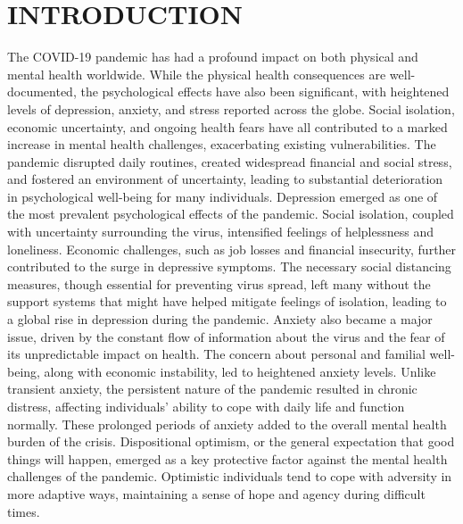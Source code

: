 \documentclass[a4paper]{article}
\begin{document}
\section{INTRODUCTION}
\vspace{0.5em}
The COVID-19 pandemic has had a profound impact on both physical and mental health worldwide.
While the physical health consequences are well-documented, the psychological effects have also been significant, with heightened levels of depression, anxiety, and stress reported across the globe.
Social isolation, economic uncertainty, and ongoing health fears have all contributed to a marked increase in mental health challenges, exacerbating existing vulnerabilities.
The pandemic disrupted daily routines, created widespread financial and social stress, and fostered an environment of uncertainty, leading to substantial deterioration in psychological well-being for many individuals.
\vspace{0.5em}\newline
Depression emerged as one of the most prevalent psychological effects of the pandemic.
Social isolation, coupled with uncertainty surrounding the virus, intensified feelings of helplessness and loneliness. Economic challenges, such as job losses and financial insecurity, further contributed to the surge in depressive symptoms.
The necessary social distancing measures, though essential for preventing virus spread,
left many without the support systems that might have helped mitigate feelings of isolation, leading to a global rise in depression during the pandemic.
\vspace{0.5em}\newline
Anxiety also became a major issue, driven by the constant flow of information about the virus and the fear of its unpredictable impact on health.
The concern about personal and familial well-being, along with economic instability, led to heightened anxiety levels.
Unlike transient anxiety, the persistent nature of the pandemic resulted in chronic distress, affecting individuals' ability to cope with daily life and function normally.
These prolonged periods of anxiety added to the overall mental health burden of the crisis.
\vspace{0.5em}\newline
Dispositional optimism, or the general expectation that good things will happen, emerged as a key protective factor against the mental health challenges of the pandemic.
Optimistic individuals tend to cope with adversity in more adaptive ways, maintaining a sense of hope and agency during difficult times.
\end{document}
